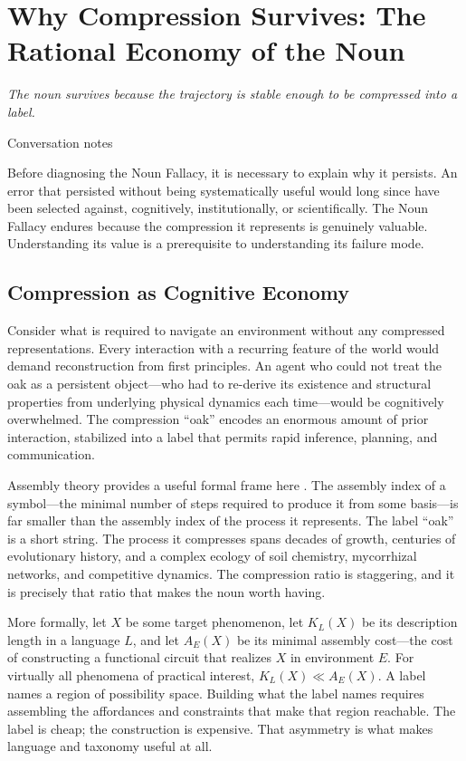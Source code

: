 \documentclass[12pt, a4paper]{article}
\theoremstyle{plain}
\theoremstyle{definition}
\theoremstyle{remark}
\begin{document}
\section{Why Compression Survives: The Rational Economy of the Noun}

\epigraph{\textit{The noun survives because the trajectory is stable enough
to be compressed into a label.}}{Conversation notes}

\noindent
Before diagnosing the Noun Fallacy, it is necessary to explain why it
persists. An error that persisted without being systematically useful would
long since have been selected against, cognitively, institutionally, or
scientifically. The Noun Fallacy endures because the compression it represents
is genuinely valuable. Understanding its value is a prerequisite to
understanding its failure mode.

\subsection{Compression as Cognitive Economy}

Consider what is required to navigate an environment without any compressed
representations. Every interaction with a recurring feature of the world would
demand reconstruction from first principles. An agent who could not treat the
oak as a persistent object---who had to re-derive its existence and structural
properties from underlying physical dynamics each time---would be cognitively
overwhelmed. The compression ``oak'' encodes an enormous amount of prior
interaction, stabilized into a label that permits rapid inference, planning,
and communication.

Assembly theory provides a useful formal frame here \citep{cronin2020assembly}.
The assembly index of a symbol---the minimal number of steps required to
produce it from some basis---is far smaller than the assembly index of the
process it represents. The label ``oak'' is a short string. The process it
compresses spans decades of growth, centuries of evolutionary history, and a
complex ecology of soil chemistry, mycorrhizal networks, and competitive
dynamics. The compression ratio is staggering, and it is precisely that ratio
that makes the noun worth having.

More formally, let $X$ be some target phenomenon, let $K_L(X)$ be its
description length in a language $L$, and let $A_E(X)$ be its minimal assembly
cost---the cost of constructing a functional circuit that realizes $X$ in
environment $E$. For virtually all phenomena of practical interest,
$K_L(X) \ll A_E(X)$. A label names a region of possibility space. Building
what the label names requires assembling the affordances and constraints that
make that region reachable. The label is cheap; the construction is expensive.
That asymmetry is what makes language and taxonomy useful at all.
\end{document}
